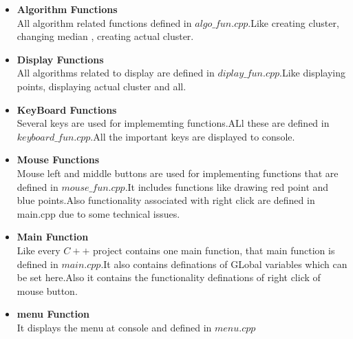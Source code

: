 \documentclass[a4paper,10pt]{report}
\begin{document}
\begin{itemize}
\item   \textbf{Algorithm Functions}          \\
            All algorithm related functions defined in $algo\_fun.cpp$.Like creating cluster, changing median , creating actual 
            cluster.

\item  \textbf{Display Functions}              \\
           All algorithms related to display are defined in $diplay\_fun.cpp$.Like displaying points, displaying actual cluster
           and all.

\item   \textbf{KeyBoard Functions}         \\
          Several keys are used for implememting functions.ALl these are defined in $keyboard\_fun.cpp$.All the important
          keys are displayed to console.
          
\item \textbf{Mouse Functions}            \\
          Mouse left and middle buttons are used for implementing functions that are defined in $mouse\_fun.cpp$.It includes
          functions like drawing red point and blue points.Also functionality associated with right click are defined in main.cpp
          due to some technical issues.
       
\item \textbf{Main Function}              \\
          Like every $C++$ project contains  one main function, that main function is defined in $main.cpp$.It also
          contains definations of GLobal variables which can be set here.Also it contains the functionality definations
          of right click of mouse button.
          
          
\item \textbf{menu Function }              \\
          It displays the menu at console and defined in $menu.cpp$
          
\end{itemize}
\end{document}
